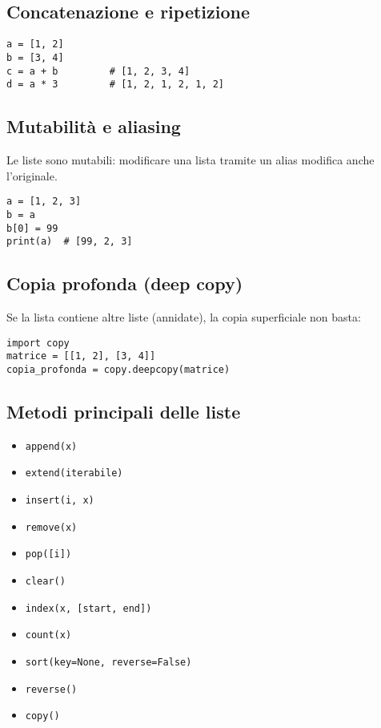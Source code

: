 \documentclass[a4paper,12pt]{article}
\begin{document}
\subsection*{Concatenazione e ripetizione}
\begin{lstlisting}
a = [1, 2]
b = [3, 4]
c = a + b         # [1, 2, 3, 4]
d = a * 3         # [1, 2, 1, 2, 1, 2]
\end{lstlisting}

\subsection*{Mutabilità e aliasing}
Le liste sono mutabili: modificare una lista tramite un alias modifica anche l'originale.
\begin{lstlisting}
a = [1, 2, 3]
b = a
b[0] = 99
print(a)  # [99, 2, 3]
\end{lstlisting}

\subsection*{Copia profonda (deep copy)}
Se la lista contiene altre liste (annidate), la copia superficiale non basta:
\begin{lstlisting}
import copy
matrice = [[1, 2], [3, 4]]
copia_profonda = copy.deepcopy(matrice)
\end{lstlisting}

\subsection*{Metodi principali delle liste}
\begin{itemize}
    \item \texttt{append(x)}
    \item \texttt{extend(iterabile)}
    \item \texttt{insert(i, x)}
    \item \texttt{remove(x)}
    \item \texttt{pop([i])}
    \item \texttt{clear()}
    \item \texttt{index(x, [start, end])}
    \item \texttt{count(x)}
    \item \texttt{sort(key=None, reverse=False)}
    \item \texttt{reverse()}
    \item \texttt{copy()}
\end{itemize}
\end{document}
